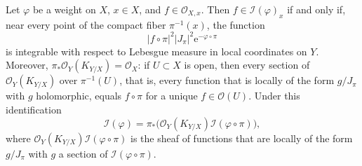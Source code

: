 \begin{proposition}\label{prop:birational-weighted-change-variables}
Let $\varphi$ be a weight on $X$, $x\in X$, and $f\in\mathcal O_{X,x}$. Then $f\in\mathcal I(\varphi)_x$ if and only if, near every point of the compact fiber $\pi^{-1}(x)$, the function
\begin{equation}\label{eq:birational-weighted-integrand}
 |f\circ\pi|^2|J_\pi|^2\mathrm e^{-\varphi\circ\pi}
\end{equation}
is integrable with respect to Lebesgue measure in local coordinates on $Y$. Moreover, $\pi_*\mathcal O_Y(K_{Y/X})=\mathcal O_X$: if $U\subset X$ is open, then every section of $\mathcal O_Y(K_{Y/X})$ over $\pi^{-1}(U)$, that is, every function that is locally of the form $g/J_\pi$ with $g$ holomorphic, equals $f\circ\pi$ for a unique $f\in\mathcal O(U)$. Under this identification
\begin{equation}\label{eq:multiplier-birational-transform}
 \mathcal I(\varphi)
 =\pi_*\bigl(\mathcal O_Y(K_{Y/X})\mathcal I(\varphi\circ\pi)\bigr),
\end{equation}
where $\mathcal O_Y(K_{Y/X})\mathcal I(\varphi\circ\pi)$ is the sheaf of functions that are locally of the form $g/J_\pi$ with $g$ a section of $\mathcal I(\varphi\circ\pi)$.
\end{proposition}
